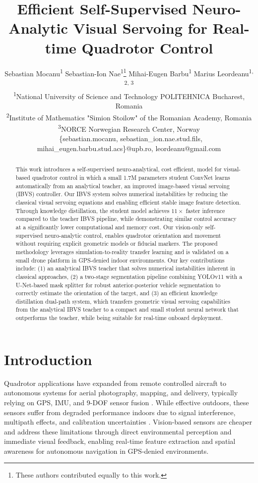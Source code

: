 \documentclass[10pt,twocolumn,letterpaper]{article}
\title{Efficient Self-Supervised Neuro-Analytic Visual Servoing for Real-time Quadrotor Control}
\author{
Sebastian Mocanu\textsuperscript{1} \quad
Sebastian-Ion Nae\textsuperscript{1}\thanks{These authors contributed equally to this work.} \quad
Mihai-Eugen Barbu\textsuperscript{1}\footnotemark[1] \quad
Marius Leordeanu\textsuperscript{1, 2, 3} \\
\textsuperscript{1}National University of Science and Technology POLITEHNICA Bucharest, Romania \\
\textsuperscript{2}Institute of Mathematics "Simion Stoilow" of the Romanian Academy, Romania \\
\textsuperscript{3}NORCE Norwegian Research Center, Norway \\
{\footnotesize\ttfamily\ \{sebastian.mocanu, sebastian\_ion.nae.stud.fils, mihai\_eugen.barbu.stud.acs\}@upb.ro, leordeanu@gmail.com} 
}
\begin{document}
\maketitle

\begin{abstract}
This work introduces a self-supervised neuro-analytical, cost efficient, model for visual-based quadrotor control in which a small 1.7M parameters student ConvNet learns automatically from an analytical teacher, an improved image-based visual servoing (IBVS) controller. Our IBVS system solves numerical instabilities by reducing the classical visual servoing equations and enabling efficient stable image feature detection. Through knowledge distillation, the student model achieves $11\times$ faster inference compared to the teacher IBVS pipeline, while demonstrating similar control accuracy at a significantly lower computational and memory cost.
Our vision-only self-supervised neuro-analytic control, enables quadrotor orientation and movement without requiring explicit geometric models or fiducial markers. The proposed methodology leverages simulation-to-reality transfer learning and is validated on a small drone platform in GPS-denied indoor environments. Our key contributions include: (1) an analytical IBVS teacher that solves numerical instabilities inherent in classical approaches, (2) a two-stage segmentation pipeline combining YOLOv11 with a U-Net-based mask splitter for robust anterior-posterior vehicle segmentation to correctly estimate the orientation of the target, and (3) an efficient knowledge distillation dual-path system, which transfers geometric visual servoing capabilities from the analytical IBVS teacher to a compact and small student neural network that outperforms the teacher, while being suitable for real-time onboard deployment.
\end{abstract}

\section{Introduction}
\label{sec:intro}
Quadrotor applications have expanded from remote controlled aircraft to autonomous systems for aerial photography, mapping, and delivery, typically relying on GPS, IMU, and 9-DOF sensor fusion \cite{arreola2018improvement}.  While effective outdoors, these sensors suffer from degraded performance indoors due to signal interference, multipath effects, and calibration uncertainties \cite{tang2024control, rebbapragada2024c2fdrone}. Vision-based sensors are cheaper and address these limitations through direct environmental perception and immediate visual feedback, enabling real-time feature extraction and spatial awareness for autonomous navigation in GPS-denied environments.
\end{document}

